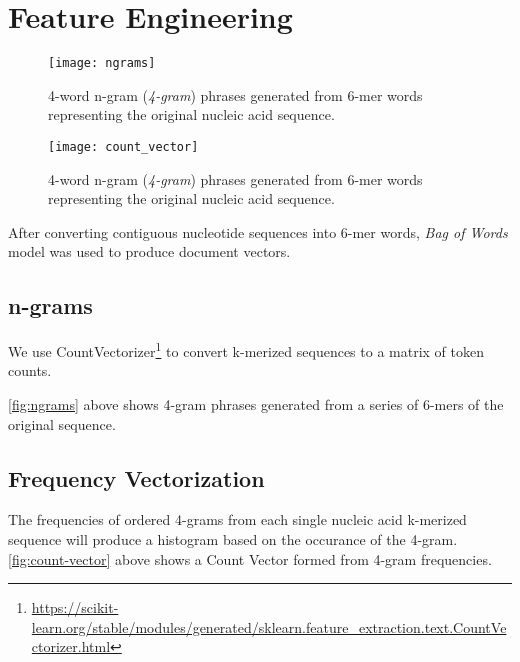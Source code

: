 \section{Feature Engineering}
%
  \begin{figure}
    \centering
    \texttt{[image: ngrams]}
    \caption{%
       4-word n-gram (\textit{4-gram}) phrases generated from 6-mer words representing the original nucleic acid sequence.
    }
    \label{fig:ngrams}
  \end{figure}
%
  \begin{figure}
    \centering
    \texttt{[image: count\_vector]}
    \caption{%
       4-word n-gram (\textit{4-gram}) phrases generated from 6-mer words representing the original nucleic acid sequence.
    }
    \label{fig:count-vector}
  \end{figure}
%

After converting contiguous nucleotide sequences into 6-mer words, \textit{Bag of Words} model was used to produce document vectors.


\subsection{n-grams}

We use CountVectorizer\footnote{\url{https://scikit-learn.org/stable/modules/generated/sklearn.feature_extraction.text.CountVectorizer.html}} to convert k-merized sequences to a matrix of token counts.

\autoref{fig:ngrams} above shows 4-gram phrases generated from a series of 6-mers of the original sequence. 
%
\subsection{Frequency Vectorization}
The frequencies of ordered 4-grams from each single nucleic acid k-merized sequence will produce a histogram based on the occurance of the 4-gram.
\autoref{fig:count-vector} above shows a Count Vector formed from 4-gram frequencies. 
%
